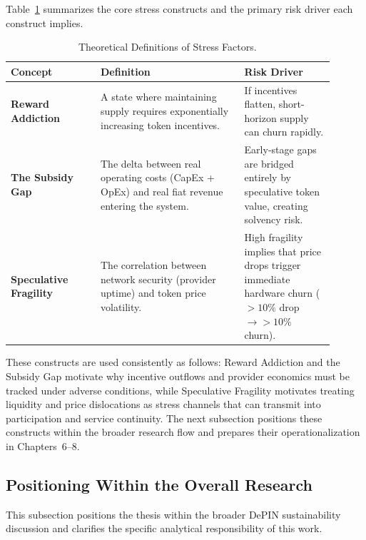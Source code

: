 Table~\ref{tab:stress_factors} summarizes the core stress constructs and the primary risk driver each construct implies.

\begin{table}[ht]
    \centering
    \small
    \renewcommand{\arraystretch}{1.5}
    \begin{tabular}{>{\raggedright\arraybackslash}p{0.25\linewidth} >{\raggedright\arraybackslash}p{0.4\linewidth} >{\raggedright\arraybackslash}p{0.25\linewidth}}
        \toprule
        \textbf{Concept} & \textbf{Definition} & \textbf{Risk Driver} \\
        \midrule
        \textbf{Reward Addiction} & A state where maintaining supply requires exponentially increasing token incentives. & If incentives flatten, short-horizon supply can churn rapidly. \\
        \midrule
        \textbf{The Subsidy Gap} & The delta between real operating costs (CapEx + OpEx) and real fiat revenue entering the system. & Early-stage gaps are bridged entirely by speculative token value, creating solvency risk. \\
        \midrule
        \textbf{Speculative Fragility} & The correlation between network security (provider uptime) and token price volatility. & High fragility implies that price drops trigger immediate hardware churn ($>10\%$ drop $\to >10\%$ churn). \\
        \bottomrule
    \end{tabular}
    \caption{Theoretical Definitions of Stress Factors.}
    \label{tab:stress_factors}
\end{table}

These constructs are used consistently as follows: Reward Addiction and the Subsidy Gap motivate why incentive outflows and provider economics must be tracked under adverse conditions, while Speculative Fragility motivates treating liquidity and price dislocations as stress channels that can transmit into participation and service continuity. The next subsection positions these constructs within the broader research flow and prepares their operationalization in Chapters~6--8.

\subsection{Positioning Within the Overall Research}
\label{sec:positioning}
This subsection positions the thesis within the broader DePIN sustainability discussion and clarifies the specific analytical responsibility of this work.

